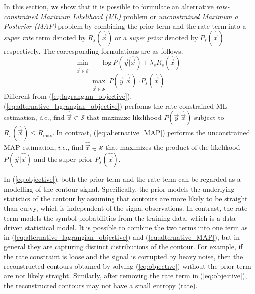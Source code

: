 In this section, we show that it is possible to formulate an alternative \textit{rate-constrained Maximum Likelihood (ML)} problem or \textit{unconstrained Maximum a Posterior (MAP)} problem by combining the prior term and the rate term into a \textit{super rate} term denoted by $R_s(\hat{\vec{x}})$ or a \textit{super prior} denoted by $P_s(\hat{\vec{x}})$ respectively.
The corresponding formulations are as follows:
\begin{equation}
\label{eq:alternative_lagrangian_objective}
\underset{\hat{\vec{x}}\in  \mathcal{S}}{\min}\ -\log P(\vec{y}|\hat{\vec{x}})+\lambda_s R_s(\hat{\vec{x}})
\end{equation}
\begin{equation}
\label{eq:alternative_MAP}
\underset{\hat{\vec{x}}\in  \mathcal{S}}{\max}\ P(\vec{y}|\hat{\vec{x}})\cdot P_s(\hat{\vec{x}})
\end{equation}
Different from (\ref{eq:lagrangian_objective}), (\ref{eq:alternative_lagrangian_objective}) performs the rate-constrained ML estimation, \textit{i.e.}, find $\hat{\vec{x}} \in  \mathcal{S}$ that maximize likelihood $P(\vec{y}|\hat{\vec{x}})$ subject to $R_s(\hat{\vec{x}})\leq R_{\max}$.
In contrast, (\ref{eq:alternative_MAP}) performs the unconstrained MAP estimation, \textit{i.e.}, find $\hat{\vec{x}} \in  \mathcal{S}$ that maximizes the product of the likelihood $P(\vec{y}|\hat{\vec{x}})$ and the super prior $P_s(\hat{\vec{x}})$.

In (\ref{eq:objective}), both the prior term and the rate term can be regarded as a modelling of the contour signal.
Specifically, the prior models the underlying statistics of the contour by assuming that contours are more likely to be straight than curvy, which is independent of the signal observations. 
In contrast, the rate term models the symbol probabilities from the training data, which is a data-driven statistical model.
It is possible to combine the two terms into one term as in (\ref{eq:alternative_lagrangian_objective}) and (\ref{eq:alternative_MAP}), but in general they are capturing distinct distributions of the contour.
For example, if the rate constraint is loose and the signal is corrupted by heavy noise, then the reconstructed contours obtained by solving (\ref{eq:objective}) without the prior term are not likely straight.
Similarly, after removing the rate term in (\ref{eq:objective}), the reconstructed contours may not have a small entropy (rate).


